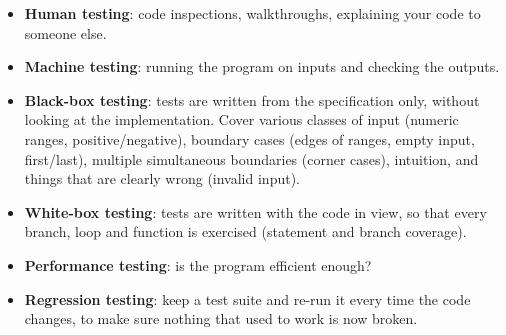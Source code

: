 \begin{itemize}
  \item \textbf{Human testing}: code inspections, walkthroughs, explaining your
        code to someone else.
  \item \textbf{Machine testing}: running the program on inputs and checking the
        outputs.
  \item \textbf{Black-box testing}: tests are written from the specification
        only, without looking at the implementation. Cover various classes of
        input (numeric ranges, positive/negative), boundary cases (edges of
        ranges, empty input, first/last), multiple simultaneous boundaries
        (corner cases), intuition, and things that are clearly wrong (invalid
        input).
  \item \textbf{White-box testing}: tests are written with the code in view, so
        that every branch, loop and function is exercised (statement and branch
        coverage).
  \item \textbf{Performance testing}: is the program efficient enough?
  \item \textbf{Regression testing}: keep a test suite and re-run it every time
        the code changes, to make sure nothing that used to work is now broken.
\end{itemize}

\begin{center}
\end{center}


